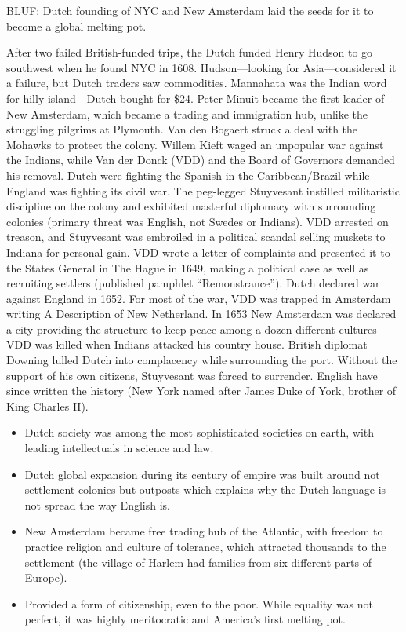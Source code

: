 \documentclass[
]{article}
\begin{document}
BLUF: Dutch founding of NYC and New Amsterdam laid the seeds for it to
become a global melting pot.

After two failed British-funded trips, the Dutch funded Henry Hudson to
go southwest when he found NYC in 1608. Hudson---looking for
Asia---considered it a failure, but Dutch traders saw commodities.
Mannahata was the Indian word for hilly island---Dutch bought for \$24.
Peter Minuit became the first leader of New Amsterdam, which became a
trading and immigration hub, unlike the struggling pilgrims at Plymouth.
Van den Bogaert struck a deal with the Mohawks to protect the colony.
Willem Kieft waged an unpopular war against the Indians, while Van der
Donck (VDD) and the Board of Governors demanded his removal. Dutch were
fighting the Spanish in the Caribbean/Brazil while England was fighting
its civil war. The peg-legged Stuyvesant instilled militaristic
discipline on the colony and exhibited masterful diplomacy with
surrounding colonies (primary threat was English, not Swedes or
Indians). VDD arrested on treason, and Stuyvesant was embroiled in a
political scandal selling muskets to Indiana for personal gain. VDD
wrote a letter of complaints and presented it to the States General in
The Hague in 1649, making a political case as well as recruiting
settlers (published pamphlet ``Remonstrance''). Dutch declared war
against England in 1652. For most of the war, VDD was trapped in
Amsterdam writing A Description of New Netherland. In 1653 New Amsterdam
was declared a city providing the structure to keep peace among a dozen
different cultures VDD was killed when Indians attacked his country
house. British diplomat Downing lulled Dutch into complacency while
surrounding the port. Without the support of his own citizens,
Stuyvesant was forced to surrender. English have since written the
history (New York named after James Duke of York, brother of King
Charles II).

\begin{itemize}
\item
  Dutch society was among the most sophisticated societies on earth,
  with leading intellectuals in science and law.
\item
  Dutch global expansion during its century of empire was built around
  not settlement colonies but outposts which explains why the Dutch
  language is not spread the way English is.
\item
  New Amsterdam became free trading hub of the Atlantic, with freedom to
  practice religion and culture of tolerance, which attracted thousands
  to the settlement (the village of Harlem had families from six
  different parts of Europe).
\item
  Provided a form of citizenship, even to the poor. While equality was
  not perfect, it was highly meritocratic and America's first melting
  pot.
\end{itemize}
\end{document}
